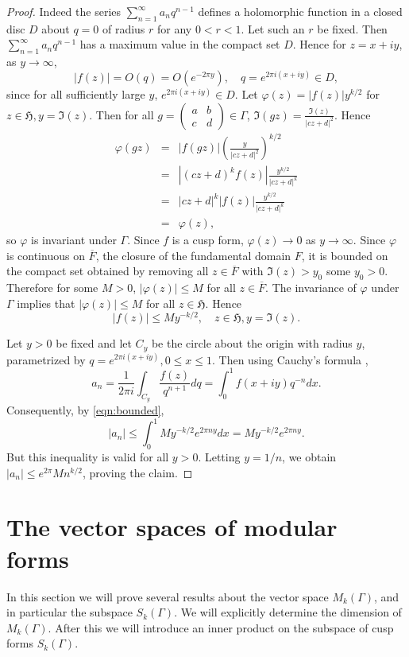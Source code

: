 \documentclass{article}
\begin{document}
\begin{proof}
Indeed the series $\sum_{n=1}^\infty a_n q^{n-1}$ defines a holomorphic function in a closed disc $D$ about $q=0$ of radius $r$ for any $0<r<1$. Let such an $r$ be fixed. Then $\sum_{n=1}^\infty a_n q^{n-1}$ has a maximum value in the compact
set $D$.
Hence for $z=x+iy$, as $y \to \infty$,
\[
|f(z)|=O(q)=O(e^{-2\pi y}), \quad q=e^{2\pi i(x+iy)} \in D,
\] 
since for all sufficiently large $y$, $e^{2\pi i(x+iy)} \in D$.
Let $\varphi(z)=|f(z)|y^{k/2}$ for $z \in \mathfrak{H}, y=\Im(z)$. Then for all $g=\begin{pmatrix}a&b\\c&d\end{pmatrix} \in \Gamma$, $\Im(gz)=\frac{\Im(z)}{|cz+d|^2}$. Hence
\begin{eqnarray*}
\varphi(gz)&=&|f(gz)| (\frac{y}{|cz+d|^2})^{k/2}\\
&=&|(cz+d)^k f(z)| \frac{y^{k/2}}{|cz+d|^k}\\
&=&|cz+d|^k |f(z)| \frac{y^{k/2}}{|cz+d|^k}\\
&=&\varphi(z),
\end{eqnarray*}
so $\varphi$ is invariant under $\Gamma$. Since $f$ is a cusp form, $\varphi(z) \to 0$ as $y \to \infty$.
Since $\varphi$ is continuous on $\overline{F}$, the closure of the fundamental domain $F$, it is bounded on the compact set obtained by removing all
$z \in \overline{F}$ with $\Im(z)>y_0$ some $y_0>0$. Therefore for some $M>0$, $|\varphi(z)| \leq M$ for all $z \in \overline{F}$.
The invariance of $\varphi$ under $\Gamma$ implies that $|\varphi(z)|\leq M$ for all $z \in \mathfrak{H}$.
Hence 
\begin{equation}
\label{eqn:bounded}
|f(z)| \leq My^{-k/2}, \quad z \in \mathfrak{H}, y=\Im(z).
\end{equation}

Let $y>0$ be fixed and let $C_y$ be the circle about the origin with radius $y$, parametrized by $q=e^{2\pi i(x+iy)}, 0 \leq x \leq 1$. Then
using Cauchy's formula \cite[Chapter III, Theorem 7.1]{MR1659317},
\[
a_n=\frac{1}{2\pi i} \int_{C_y} \frac{f(z)}{q^{n+1}} dq=\int_0^1 f(x+iy)q^{-n} dx.
\]
Consequently, by \eqref{eqn:bounded},
\[
|a_n| \leq \int_0^1 My^{-k/2} e^{2\pi ny} dx=My^{-k/2}e^{2\pi ny}.
\]
But this inequality is valid for all $y>0$. Letting $y=1/n$, we obtain $|a_n| \leq e^{2\pi}Mn^{k/2}$, proving the claim.
\end{proof}

\section{The vector spaces of modular forms}
\label{section:vs}
In this section we will prove several results about the vector space $M_k(\Gamma)$, and in particular the subspace
$S_k(\Gamma)$. We will explicitly determine the dimension of $M_k(\Gamma)$. After this we 
will introduce an inner product on the subspace of cusp forms $S_k(\Gamma)$.
\end{document}
